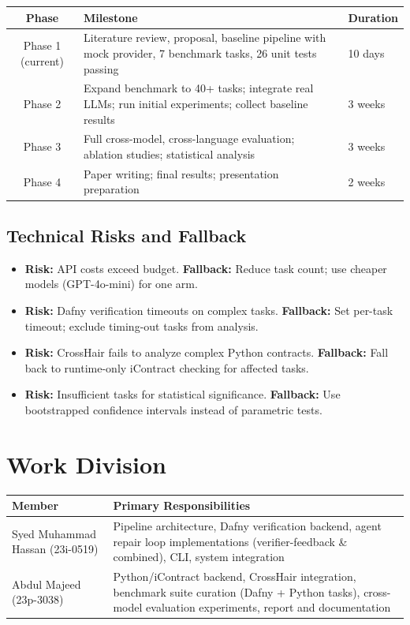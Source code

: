 \documentclass[11pt,a4paper]{article}
\begin{document}
\begin{table}[H]
\centering
\small
\begin{tabularx}{\textwidth}{|c|X|X|}
\hline
\textbf{Phase} & \textbf{Milestone} & \textbf{Duration} \\
\hline
Phase 1 (current) & Literature review, proposal, baseline pipeline with mock provider, 7 benchmark tasks, 26 unit tests passing & 10 days \\
\hline
Phase 2 & Expand benchmark to 40+ tasks; integrate real LLMs; run initial experiments; collect baseline results & 3 weeks \\
\hline
Phase 3 & Full cross-model, cross-language evaluation; ablation studies; statistical analysis & 3 weeks \\
\hline
Phase 4 & Paper writing; final results; presentation preparation & 2 weeks \\
\hline
\end{tabularx}
\end{table}

\subsection{Technical Risks and Fallback}
\begin{itemize}[noitemsep]
    \item \textbf{Risk:} API costs exceed budget. \textbf{Fallback:} Reduce task count; use cheaper models (GPT-4o-mini) for one arm.
    \item \textbf{Risk:} Dafny verification timeouts on complex tasks. \textbf{Fallback:} Set per-task timeout; exclude timing-out tasks from analysis.
    \item \textbf{Risk:} CrossHair fails to analyze complex Python contracts. \textbf{Fallback:} Fall back to runtime-only iContract checking for affected tasks.
    \item \textbf{Risk:} Insufficient tasks for statistical significance. \textbf{Fallback:} Use bootstrapped confidence intervals instead of parametric tests.
\end{itemize}

\section{Work Division}

\begin{table}[H]
\centering
\begin{tabularx}{\textwidth}{|l|X|}
\hline
\textbf{Member} & \textbf{Primary Responsibilities} \\
\hline
Syed Muhammad Hassan (23i-0519) & Pipeline architecture, Dafny verification backend, agent repair loop implementations (verifier-feedback \& combined), CLI, system integration \\
\hline
Abdul Majeed (23p-3038) & Python/iContract backend, CrossHair integration, benchmark suite curation (Dafny + Python tasks), cross-model evaluation experiments, report and documentation \\
\hline
\end{tabularx}
\end{table}
\end{document}
